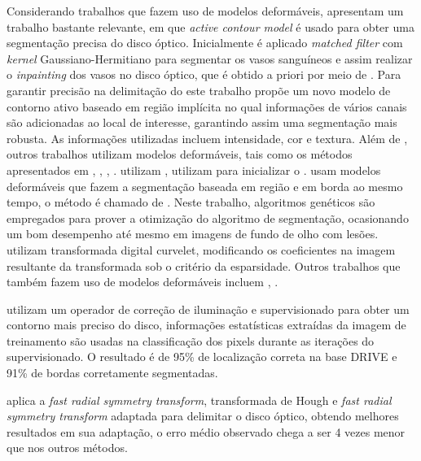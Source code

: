 Considerando trabalhos que fazem uso de modelos deformáveis,  apresentam um trabalho bastante relevante, em que \textit{active contour model} é usado para obter uma segmentação precisa do disco óptico. Inicialmente é aplicado  \textit{matched filter} com \textit{kernel} Gaussiano-Hermitiano para segmentar os vasos sanguíneos e assim realizar o \textit{inpainting} dos vasos no disco óptico, que é obtido a priori por meio de  . Para garantir precisão na delimitação do  este trabalho propõe um novo modelo de contorno ativo baseado em região implícita no qual informações de vários canais são adicionadas ao local de interesse, garantindo assim uma segmentação mais robusta. As informações utilizadas incluem intensidade, cor e textura. Além de , outros trabalhos utilizam modelos deformáveis, tais como os métodos apresentados em , , , .  utilizam ,  utilizam  para inicializar o .  usam modelos deformáveis que fazem a segmentação baseada em região e em borda ao mesmo tempo, o método é chamado de . Neste trabalho, algoritmos genéticos são empregados para prover a otimização do algoritmo de segmentação, ocasionando um bom desempenho até mesmo em imagens de fundo de olho com lesões.  utilizam transformada digital curvelet, modificando os coeficientes na imagem resultante da transformada sob o critério da esparsidade. Outros trabalhos que também fazem uso de modelos deformáveis incluem , . 

 utilizam um operador de correção de iluminação e  supervisionado para obter um contorno mais preciso do disco,  informações estatísticas extraídas da imagem de treinamento são usadas na classificação dos pixels durante as iterações do  supervisionado. O resultado é de 95\% de localização correta na base DRIVE e 91\% de bordas corretamente segmentadas.


 aplica a \textit{fast radial symmetry transform}, transformada de Hough e \textit{fast radial symmetry transform} adaptada para delimitar o disco óptico, obtendo melhores resultados em sua adaptação, o erro médio observado chega a ser 4 vezes menor que nos outros métodos.  

